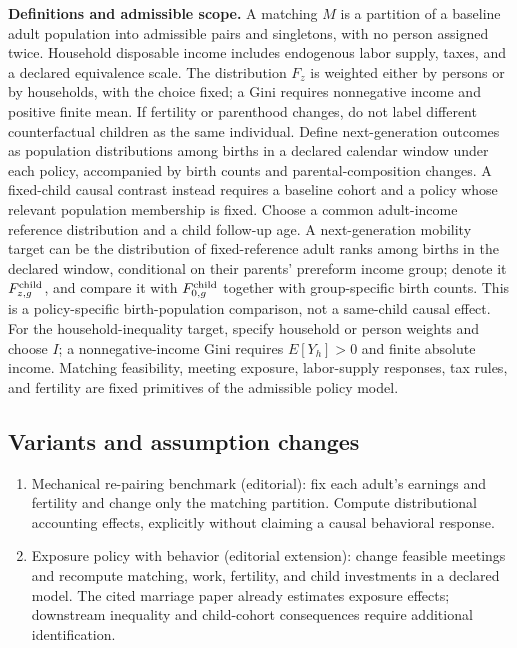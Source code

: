 \documentclass[11pt,a4paper]{article}
\begin{document}
\textbf{Definitions and admissible scope.} A matching \(M\) is a partition of a baseline adult population into admissible pairs and singletons, with no person assigned twice. Household disposable income includes endogenous labor supply, taxes, and a declared equivalence scale. The distribution \(F_z\) is weighted either by persons or by households, with the choice fixed; a Gini requires nonnegative income and positive finite mean. If fertility or parenthood changes, do not label different counterfactual children as the same individual. Define next-generation outcomes as population distributions among births in a declared calendar window under each policy, accompanied by birth counts and parental-composition changes. A fixed-child causal contrast instead requires a baseline cohort and a policy whose relevant population membership is fixed. Choose a common adult-income reference distribution and a child follow-up age. A next-generation mobility target can be the distribution of fixed-reference adult ranks among births in the declared window, conditional on their parents' prereform income group; denote it \(F^{\rm child}_{z,g}\), and compare it with \(F^{\rm child}_{0,g}\) together with group-specific birth counts. This is a policy-specific birth-population comparison, not a same-child causal effect. For the household-inequality target, specify household or person weights and choose \(I\); a nonnegative-income Gini requires \(E[Y_h]>0\) and finite absolute income. Matching feasibility, meeting exposure, labor-supply responses, tax rules, and fertility are fixed primitives of the admissible policy model.
\subsection*{Variants and assumption changes}
\begin{enumerate}
\item Mechanical re-pairing benchmark (editorial): fix each adult's earnings and fertility and change only the matching partition. Compute distributional accounting effects, explicitly without claiming a causal behavioral response.
\item Exposure policy with behavior (editorial extension): change feasible meetings and recompute matching, work, fertility, and child investments in a declared model. The cited marriage paper already estimates exposure effects; downstream inequality and child-cohort consequences require additional identification.
\end{enumerate}
\end{document}
